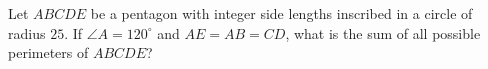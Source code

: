 Let $ABCDE$ be a pentagon with integer side lengths inscribed in a circle of radius $25$. If $\angle A = 120^\circ$ and $AE= AB= CD$, what is the sum of all possible perimeters of $ABCDE$?

